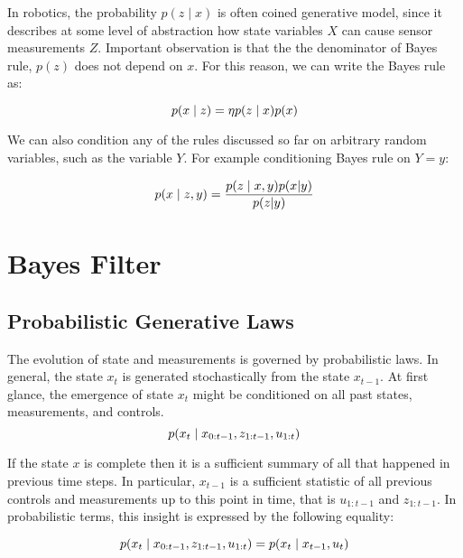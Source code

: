 \newpage
In robotics, the probability $p(z \mid x)$ is often coined generative model, since it describes at some level of abstraction how state variables $X$ can cause sensor measurements $Z$.
Important observation is that the the denominator of Bayes rule, $p(z)$ does not depend on $x$. For this reason, we can write the Bayes rule as:

\begin{equation}
  p(x \mid z) = \eta p(z \mid x)p(x) \\
  \label{eq:Bayes Rule with normalization factor}
\end{equation}

We can also condition any of the rules discussed so far on arbitrary random variables, such as the variable $Y$. For example conditioning Bayes rule on $Y=y$:

\begin{equation}
  p(x \mid z, y) = \frac{p(z \mid x,y)p(x | y)}{p(z | y)} \\
\end{equation}

\newpage

\section{Bayes Filter}

\subsection{Probabilistic Generative Laws}

The evolution of state and measurements is governed by probabilistic laws.
In general, the state $x_t$ is generated stochastically from the state $x_{t-1}$.
At first glance, the emergence of state $x_t$ might be conditioned on all past states, measurements, and controls.
\begin{equation}
  p(x_t \mid x_{0:t-1}, z_{1:t-1}, u_{1:t}) \\
  \label{eq:State probabilibility distribution}
\end{equation}

If the state $x$ is complete then it is a sufficient summary of all that happened in previous time steps.
In particular, $x_{t-1}$ is a sufficient statistic of all previous controls and measurements up to this point in time, that is $u_{1:t-1}$ and $z_{1:t-1}$.
In probabilistic terms, this insight is expressed by the following equality:

\begin{equation}
  p(x_t \mid x_{0:t-1}, z_{1:t-1}, u_{1:t}) = p(x_t \mid x_{t-1}, u_t) \\
\end{equation}

